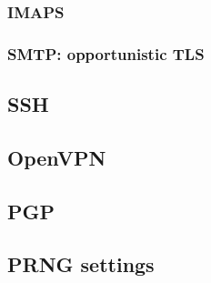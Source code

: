 
\subsubsection{IMAPS}
\subsubsection{SMTP: opportunistic TLS}

\subsection{SSH}

\subsection{OpenVPN}

\subsection{PGP}

\subsection{PRNG settings}
